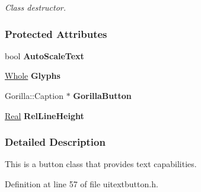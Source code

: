 \begin{DoxyCompactItemize}
\begin{DoxyCompactList}\small\item\em Class destructor. \item\end{DoxyCompactList}\end{DoxyCompactItemize}
\subsubsection*{Protected Attributes}
\begin{DoxyCompactItemize}
\item 
\hypertarget{classMezzanine_1_1UI_1_1TextButton_a825fcc3cca121bf40f627912fb8aab05}{
bool {\bfseries AutoScaleText}}
\label{classMezzanine_1_1UI_1_1TextButton_a825fcc3cca121bf40f627912fb8aab05}

\item 
\hypertarget{classMezzanine_1_1UI_1_1TextButton_a2b726b73c7996ee3397627f1ca9d0f09}{
\hyperlink{namespaceMezzanine_adcbb6ce6d1eb4379d109e51171e2e493}{Whole} {\bfseries Glyphs}}
\label{classMezzanine_1_1UI_1_1TextButton_a2b726b73c7996ee3397627f1ca9d0f09}

\item 
\hypertarget{classMezzanine_1_1UI_1_1TextButton_ab27279831f7710a2a9a5153121a76600}{
Gorilla::Caption $\ast$ {\bfseries GorillaButton}}
\label{classMezzanine_1_1UI_1_1TextButton_ab27279831f7710a2a9a5153121a76600}

\item 
\hypertarget{classMezzanine_1_1UI_1_1TextButton_a73953c117c0177981245aa0c2ac16de7}{
\hyperlink{namespaceMezzanine_a726731b1a7df72bf3583e4a97282c6f6}{Real} {\bfseries RelLineHeight}}
\label{classMezzanine_1_1UI_1_1TextButton_a73953c117c0177981245aa0c2ac16de7}

\end{DoxyCompactItemize}


\subsubsection{Detailed Description}
This is a button class that provides text capabilities. 

Definition at line 57 of file uitextbutton.h.



